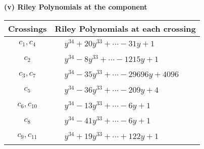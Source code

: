 \documentclass[1p]{elsarticle_modified}
\theoremstyle{definition}
\begin{document}
\newpage\renewcommand{\arraystretch}{1}
\flushleft \textbf{(v) Riley Polynomials at the component}\newline \\
\begin{tabular}{m{50pt}|m{274pt}}
Crossings & \hspace{64pt}Riley Polynomials at each crossing \\
\hline $$\begin{aligned}c_{1},c_{4}\end{aligned}$$&$\begin{aligned}
&y^{34}+20 y^{33}+\cdots-31 y+1
\end{aligned}$\\
\hline $$\begin{aligned}c_{2}\end{aligned}$$&$\begin{aligned}
&y^{34}-8 y^{33}+\cdots-1215 y+1
\end{aligned}$\\
\hline $$\begin{aligned}c_{3},c_{7}\end{aligned}$$&$\begin{aligned}
&y^{34}-35 y^{33}+\cdots-29696 y+4096
\end{aligned}$\\
\hline $$\begin{aligned}c_{5}\end{aligned}$$&$\begin{aligned}
&y^{34}-36 y^{33}+\cdots-209 y+4
\end{aligned}$\\
\hline $$\begin{aligned}c_{6},c_{10}\end{aligned}$$&$\begin{aligned}
&y^{34}-13 y^{33}+\cdots-6 y+1
\end{aligned}$\\
\hline $$\begin{aligned}c_{8}\end{aligned}$$&$\begin{aligned}
&y^{34}-41 y^{33}+\cdots-6 y+1
\end{aligned}$\\
\hline $$\begin{aligned}c_{9},c_{11}\end{aligned}$$&$\begin{aligned}
&y^{34}+19 y^{33}+\cdots+122 y+1
\end{aligned}$\\
\hline
\end{tabular}\\~\\
\end{document}
